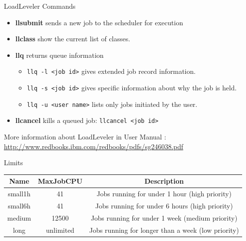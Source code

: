 \documentclass[final,t]{beamer}
\begin{document}
\begin{frame}[fragile]{}
\begin{columns}[t]
\begin{column}{.32\linewidth}
 
      \begin{block}{LoadLeveler Commands}
        \begin{itemize}
        \item  \textbf{llsubmit} sends a new job to the scheduler for execution
        \item  \textbf{llclass} show the current list of classes.
        \item  \textbf{llq} returns queue information 
         \begin{itemize}
              \item \verb|llq -l <job id>| gives extended job record information.
              \item \verb|llq -s <job id>| gives specific information about why the job is held.
              \item \verb|llq -u <user name>| lists only jobs initiated by the user.
         \end{itemize}
        \item \textbf{llcancel} kills a queued job: \verb|llcancel <job id>|
        \end{itemize}
       More information about LoadLeveler in User Manual : \url{http://www.redbooks.ibm.com/redbooks/pdfs/sg246038.pdf}
      \end{block}

      \begin{block}{Limits}
        \vspace*{-2ex}
      \begin{center}
      \begin{tabular}{|c|c|c|}
      \hline 
      \textbf{Name} & \textbf{MaxJobCPU} & \textbf{Description} \\ 
      \hline 
      small1h & 41 &  Jobs running for under 1 hour (high priority)\\ 
      \hline 
      small6h & 41 & Jobs running for under 6 hours  (high priority)\\ 
      \hline 
      medium & 12500 &  Jobs running for under 1 week  (medium priority)\\ 
      \hline 
      long & unlimited &  Jobs running for longer than a week  (low priority)\\ 
      \hline 
      \end{tabular} 
      \end{center}
        \vspace*{-2ex}
      \end{block}

 
    \end{column}
  \end{columns}
\end{frame}
\end{document}
